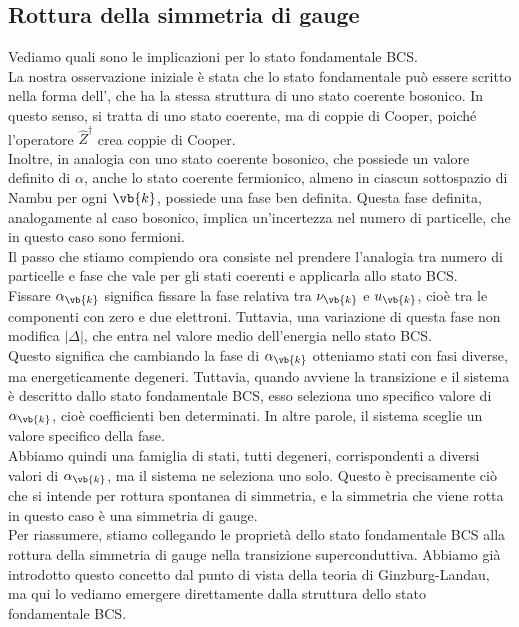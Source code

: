 \subsection{Rottura della simmetria di gauge}
Vediamo quali sono le implicazioni per lo stato fondamentale BCS.\\
La nostra osservazione iniziale è stata che lo stato fondamentale può essere scritto nella forma dell', che ha la stessa struttura di uno stato coerente bosonico. In questo senso, si tratta di uno stato coerente, ma di coppie di Cooper, poiché l'operatore $\hat{Z}^{\dag}$ crea coppie di Cooper.\\
Inoltre, in analogia con uno stato coerente bosonico, che possiede un valore definito di $\alpha$, anche lo stato coerente fermionico, almeno in ciascun sottospazio di Nambu per ogni $\vb{k}$, possiede una fase ben definita. Questa fase definita, analogamente al caso bosonico, implica un'incertezza nel numero di particelle, che in questo caso sono fermioni.\\
Il passo che stiamo compiendo ora consiste nel prendere l'analogia tra numero di particelle e fase che vale per gli stati coerenti e applicarla allo stato BCS.\\
Fissare $\alpha_{\vb{k}}$ significa fissare la fase relativa tra $\nu_{\vb{k}}$ e $u_{\vb{k}}$, cioè tra le componenti con zero e due elettroni. Tuttavia, una variazione di questa fase non modifica $|\Delta|$, che entra nel valore medio dell'energia nello stato BCS.\\
Questo significa che cambiando la fase di $\alpha_{\vb{k}}$ otteniamo stati con fasi diverse, ma energeticamente degeneri. Tuttavia, quando avviene la transizione e il sistema è descritto dallo stato fondamentale BCS, esso seleziona uno specifico valore di $\alpha_{\vb{k}}$, cioè coefficienti ben determinati. In altre parole, il sistema sceglie un valore specifico della fase.\\
Abbiamo quindi una famiglia di stati, tutti degeneri, corrispondenti a diversi valori di $\alpha_{\vb{k}}$, ma il sistema ne seleziona uno solo. Questo è precisamente ciò che si intende per rottura spontanea di simmetria, e la simmetria che viene rotta in questo caso è una simmetria di gauge.\\
Per riassumere, stiamo collegando le proprietà dello stato fondamentale BCS alla rottura della simmetria di gauge nella transizione superconduttiva. Abbiamo già introdotto questo concetto dal punto di vista della teoria di Ginzburg-Landau, ma qui lo vediamo emergere direttamente dalla struttura dello stato fondamentale BCS.\\
